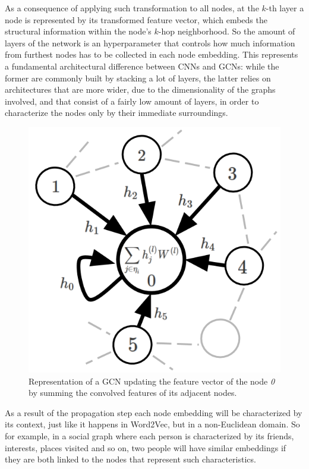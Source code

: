 \documentclass[%
    corpo=13.5pt,
    twoside,
    oldstyle,
    tipotesi=magistrale,
    greek,
    evenboxes
]{toptesi}
\begin{document}
As a consequence of applying such transformation to all nodes, at the
$k$-th layer a node is represented by its transformed feature vector, which
embeds the structural information within the node's $k$-hop neighborhood.
So the amount of layers of the network is an hyperparameter that controls how much
information from furthest nodes has to be collected in each node embedding.
This represents a fundamental architectural difference between CNNs and GCNs:
while the former are commonly built by stacking a lot of layers, the latter
relies on architectures that are more wider, due to the dimensionality of the
graphs involved, and that consist of a fairly low amount of layers, in order to
characterize the nodes only by their immediate surroundings.


\begin{figure}[h]
    \centering
    \includegraphics[scale=0.4]{img/gcn.png}
    \caption{Representation of a GCN updating the feature vector of the node \emph{0}
        by summing the convolved features of its adjacent nodes.}
    \label{fig:gcn}
\end{figure}

As a result of the propagation step each node embedding will be characterized by
its context, just like it happens in Word2Vec, but in a non-Euclidean domain.
So for example, in a social graph where each person is characterized by its
friends, interests, places visited and so on, two people will have similar
embeddings if they are both linked to the nodes that represent such
characteristics.
\end{document}
